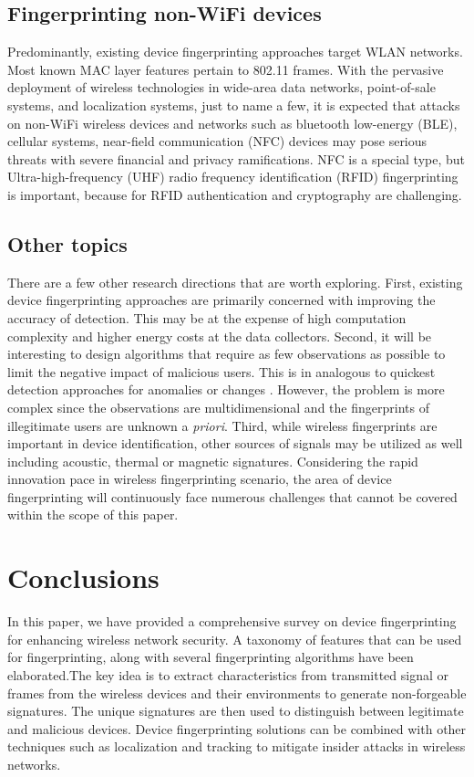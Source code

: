 \documentclass[journal,draftcls,onecolumn,11pt]{IEEEtran}
\begin{document}
\subsection{Fingerprinting non-WiFi devices}

Predominantly, existing device fingerprinting approaches target WLAN networks. Most known MAC layer features pertain to 802.11 frames. With the pervasive deployment of wireless technologies in wide-area data networks, point-of-sale systems, and localization systems, just to name a few, it is expected that attacks on non-WiFi wireless devices and networks such as bluetooth low-energy (BLE), cellular systems, near-field communication (NFC) devices may pose serious threats with severe financial and privacy ramifications. NFC is a special type, but Ultra-high-frequency (UHF) radio frequency identification (RFID) fingerprinting is important, because for RFID authentication and cryptography are challenging.

\subsection{Other topics}
There are a few other research directions that are worth exploring. First, existing device fingerprinting approaches are primarily concerned with improving the accuracy of detection. This may be at the expense of high computation complexity and higher energy costs at the data collectors. Second, it will be interesting to design algorithms that require as few observations as possible to limit the negative impact of malicious users. This is in analogous to quickest detection approaches for anomalies or changes \cite{poor2009quickest}. However, the problem is more complex since the observations are multidimensional and the fingerprints of illegitimate users are unknown a {\it priori}. Third, while wireless fingerprints are important in device identification, other sources of signals may be utilized as well including acoustic, thermal or magnetic signatures. Considering the rapid innovation pace in wireless fingerprinting scenario, the area of device fingerprinting will continuously face numerous challenges that cannot be covered within the scope of this paper.

\section{Conclusions} 
\label{sect:conclusion}
In this paper, we have provided a comprehensive survey on device fingerprinting for enhancing wireless network security. A taxonomy of features that can be used for fingerprinting, along with several fingerprinting algorithms have been elaborated.The key idea is to extract characteristics from transmitted signal or frames from the wireless devices and their environments to generate non-forgeable signatures. The unique signatures are then used to distinguish between legitimate and malicious devices. Device fingerprinting solutions can be combined with other techniques such as localization and tracking to mitigate insider attacks in wireless networks. 

 
 
\end{document}
